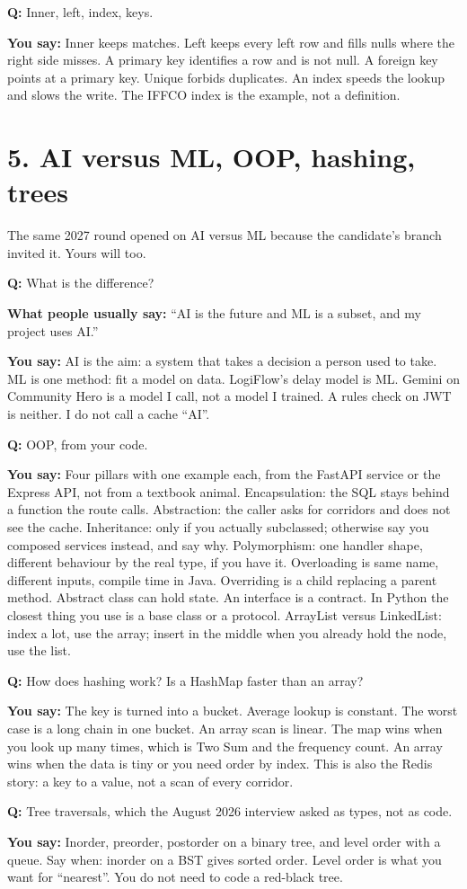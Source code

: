 \documentclass[a4paper,9.5pt]{extarticle}
\newcommand{\Q}[1]{\par\vspace{1.5pt}\noindent\textcolor{hot}{\textbf{Q:} #1}\par}
\newcommand{\Typ}[1]{\noindent\textcolor{muted}{\textbf{What people usually say:} #1}\par}
\newcommand{\Say}[1]{\noindent\textcolor{ok}{\textbf{You say:} #1}\par}
\begin{document}
\Q{Inner, left, index, keys.}
\Say{Inner keeps matches. Left keeps every left row and fills nulls where the right side misses. A primary key identifies a row and is not null. A foreign key points at a primary key. Unique forbids duplicates. An index speeds the lookup and slows the write. The IFFCO index is the example, not a definition.}

\section{5. AI versus ML, OOP, hashing, trees}
The same 2027 round opened on AI versus ML because the candidate's branch invited it. Yours will too.
\Q{What is the difference?}
\Typ{``AI is the future and ML is a subset, and my project uses AI.''}
\Say{AI is the aim: a system that takes a decision a person used to take. ML is one method: fit a model on data. LogiFlow's delay model is ML. Gemini on Community Hero is a model I call, not a model I trained. A rules check on JWT is neither. I do not call a cache ``AI''.}

\Q{OOP, from your code.}
\Say{Four pillars with one example each, from the FastAPI service or the Express API, not from a textbook animal. Encapsulation: the SQL stays behind a function the route calls. Abstraction: the caller asks for corridors and does not see the cache. Inheritance: only if you actually subclassed; otherwise say you composed services instead, and say why. Polymorphism: one handler shape, different behaviour by the real type, if you have it. Overloading is same name, different inputs, compile time in Java. Overriding is a child replacing a parent method. Abstract class can hold state. An interface is a contract. In Python the closest thing you use is a base class or a protocol. ArrayList versus LinkedList: index a lot, use the array; insert in the middle when you already hold the node, use the list.}

\Q{How does hashing work? Is a HashMap faster than an array?}
\Say{The key is turned into a bucket. Average lookup is constant. The worst case is a long chain in one bucket. An array scan is linear. The map wins when you look up many times, which is Two Sum and the frequency count. An array wins when the data is tiny or you need order by index. This is also the Redis story: a key to a value, not a scan of every corridor.}

\Q{Tree traversals, which the August 2026 interview asked as types, not as code.}
\Say{Inorder, preorder, postorder on a binary tree, and level order with a queue. Say when: inorder on a BST gives sorted order. Level order is what you want for ``nearest''. You do not need to code a red-black tree.}
\end{document}
